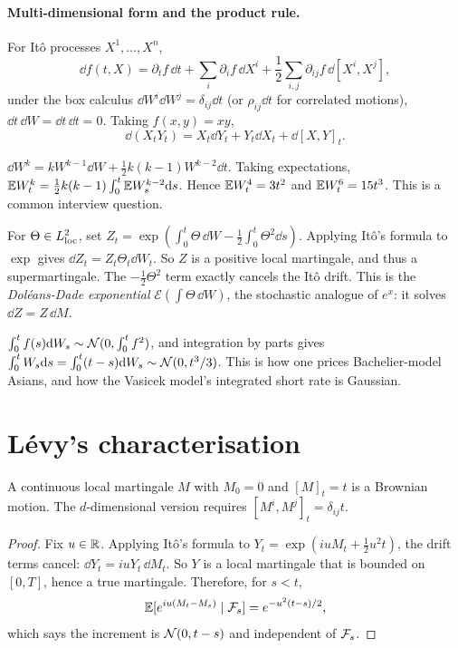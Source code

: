 \paragraph{Multi-dimensional form and the product rule.} For It\^o processes $X^1,\dots,X^n$,
\[
\dd f(t,X)=\partial_tf\,\dd t+\sum_i\partial_if\,\dd X^i+\frac12\sum_{i,j}\partial_{ij}f\,\dd[X^i,X^j],
\]
under the box calculus $\dd W^i\dd W^j=\delta_{ij}\dd t$ (or $\rho_{ij}\dd t$ for correlated motions), $\dd t\,\dd W=\dd t\,\dd t=0$. Taking $f(x,y)=xy$,
\[
\dd(X_tY_t)=X_t\dd Y_t+Y_t\dd X_t+\dd[X,Y]_t.
\]

\begin{example}\label{ex:moments}
$\dd W^{k}=kW^{k-1}\dd W+\tfrac12k(k-1)W^{k-2}\dd t$. Taking expectations, $\mathbb{E} W_t^{k}=\tfrac12k(k-1)\int_0^t\mathbb{E} W_s^{k-2}\mathrm{d} s$. Hence $\mathbb{E} W_t^4=3t^2$ and $\mathbb{E} W_t^6=15t^3$. This is a common interview question.
\end{example}

\begin{example}\label{ex:expmart}
For $\Theta\in L^2_{\rm loc}$, set $Z_t=\exp(\int_0^t\Theta\,\dd W-\tfrac12\int_0^t\Theta^2\dd s)$. Applying It\^o's formula to $\exp$ gives $\dd Z_t=Z_t\Theta_t\dd W_t$. So $Z$ is a positive local martingale, and thus a supermartingale. The $-\tfrac12\Theta^2$ term exactly cancels the It\^o drift. This is the \emph{Dol\'eans-Dade exponential} $\mathcal{E}(\int\Theta\,\dd W)$, the stochastic analogue of $e^x$: it solves $\dd Z=Z\,\dd M$.
\end{example}

\begin{example}
$\int_0^tf(s)\mathrm{d} W_s\sim\mathcal{N}(0,\int_0^tf^2)$, and integration by parts gives $\int_0^tW_s\mathrm{d} s=\int_0^t(t-s)\mathrm{d} W_s\sim\mathcal{N}(0,t^3/3)$. This is how one prices Bachelier-model Asians, and how the Vasicek model's integrated short rate is Gaussian.
\end{example}

\section{L\'evy's characterisation}

\begin{theorem}\label{thm:levychar}
A continuous local martingale $M$ with $M_0=0$ and $[M]_t=t$ is a Brownian motion. The $d$-dimensional version requires $[M^i,M^j]_t=\delta_{ij}t$.
\end{theorem}
\begin{proof}
Fix $u\in\mathbb{R}$. Applying It\^o's formula to $Y_t=\exp(iuM_t+\tfrac12u^2t)$, the drift terms cancel: $\dd Y_t=iuY_t\,\dd M_t$. So $Y$ is a local martingale that is bounded on $[0,T]$, hence a true martingale. Therefore, for $s<t$,
\[
\mathbb{E}[e^{iu(M_t-M_s)}\mid\mathcal{F}_s]=e^{-u^2(t-s)/2},
\]
which says the increment is $\mathcal{N}(0,t-s)$ and independent of $\mathcal{F}_s$.
\end{proof}

